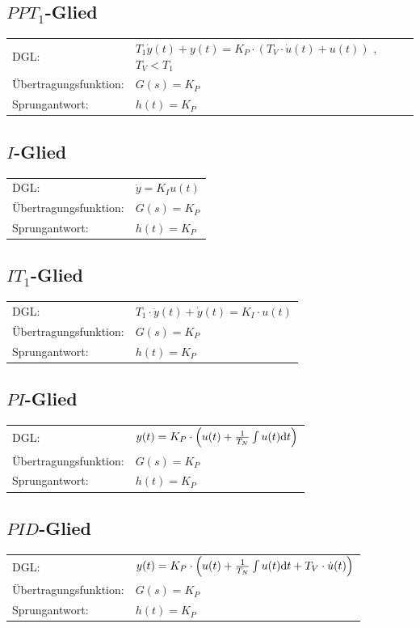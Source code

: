 \subsection{$PPT_1$-Glied}
\begin{tabular}{ll}
\rule[-2ex]{0pt}{5.5ex} DGL: & $T_1 \dot{y}(t) + y(t) = K_P \cdot \left( T_V \cdot \dot{u}(t) + u(t)\right)$ , $T_V < T_1$ \\ 
\rule[-2ex]{0pt}{5.5ex} Übertragungsfunktion: & $G(s) = K_P$ \\ 
\rule[-2ex]{0pt}{5.5ex} Sprungantwort: & $h(t) = K_P$ \\ 
\end{tabular} 
\subsection{$I$-Glied}
\begin{tabular}{ll}
\rule[-2ex]{0pt}{5.5ex} DGL: & $\dot{y} = K_I u(t)$ \\ 
\rule[-2ex]{0pt}{5.5ex} Übertragungsfunktion: & $G(s) = K_P$ \\ 
\rule[-2ex]{0pt}{5.5ex} Sprungantwort: & $h(t) = K_P$ \\ 
\end{tabular} 
\subsection{$IT_1$-Glied}
\begin{tabular}{ll}
\rule[-2ex]{0pt}{5.5ex} DGL: & $T_1 \cdot \ddot{y}(t) + \dot{y}(t) = K_I \cdot u(t)$ \\ 
\rule[-2ex]{0pt}{5.5ex} Übertragungsfunktion: & $G(s) = K_P$ \\ 
\rule[-2ex]{0pt}{5.5ex} Sprungantwort: & $h(t) = K_P$ \\ 
\end{tabular} 
\subsection{$PI$-Glied}
\begin{tabular}{ll}
\rule[-2ex]{0pt}{5.5ex} DGL: & $y(t) = K_P \cdot \left( u(t) + \frac{1}{T_N}\int u(t) \mathrm{d} t\right)$ \\ 
\rule[-2ex]{0pt}{5.5ex} Übertragungsfunktion: & $G(s) = K_P$ \\ 
\rule[-2ex]{0pt}{5.5ex} Sprungantwort: & $h(t) = K_P$ \\ 
\end{tabular} 
\subsection{$PID$-Glied}
\begin{tabular}{ll}
\rule[-2ex]{0pt}{5.5ex} DGL: &  $y(t) = K_P \cdot \left( u(t) + \frac{1}{T_N}\int u(t) \mathrm{d} t + T_V \cdot \dot{u}(t) \right)$ \\ 
\rule[-2ex]{0pt}{5.5ex} Übertragungsfunktion: & $G(s) = K_P$ \\ 
\rule[-2ex]{0pt}{5.5ex} Sprungantwort: & $h(t) = K_P$ \\ 
\end{tabular} 

